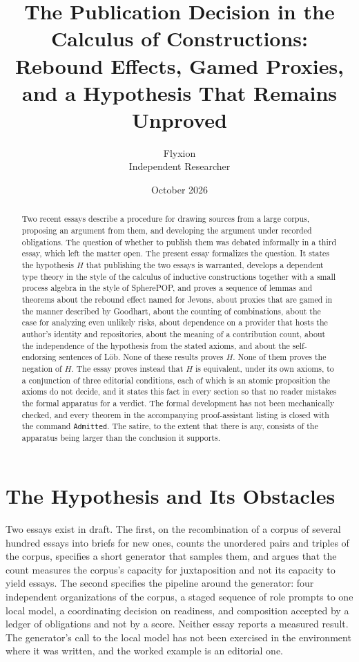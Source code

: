 \documentclass[11pt]{article}
\title{The Publication Decision in the Calculus of Constructions:\\[0.3em]
\large Rebound Effects, Gamed Proxies, and a Hypothesis That Remains Unproved}
\author{Flyxion\\Independent Researcher}
\date{October 2026}
\theoremstyle{plain}
\theoremstyle{definition}
\theoremstyle{remark}
\newcommand{\Hyp}{H}
\begin{document}
\maketitle

\begin{abstract}
\noindent Two recent essays describe a procedure for drawing sources from a large corpus, proposing an argument from them, and developing the argument under recorded obligations. The question of whether to publish them was debated informally in a third essay, which left the matter open. The present essay formalizes the question. It states the hypothesis $\Hyp$ that publishing the two essays is warranted, develops a dependent type theory in the style of the calculus of inductive constructions together with a small process algebra in the style of SpherePOP, and proves a sequence of lemmas and theorems about the rebound effect named for Jevons, about proxies that are gamed in the manner described by Goodhart, about the counting of combinations, about the case for analyzing even unlikely risks, about dependence on a provider that hosts the author's identity and repositories, about the meaning of a contribution count, about the independence of the hypothesis from the stated axioms, and about the self-endorsing sentences of L\"ob. None of these results proves $\Hyp$. None of them proves the negation of $\Hyp$. The essay proves instead that $\Hyp$ is equivalent, under its own axioms, to a conjunction of three editorial conditions, each of which is an atomic proposition the axioms do not decide, and it states this fact in every section so that no reader mistakes the formal apparatus for a verdict. The formal development has not been mechanically checked, and every theorem in the accompanying proof-assistant listing is closed with the command \texttt{Admitted}. The satire, to the extent that there is any, consists of the apparatus being larger than the conclusion it supports.
\end{abstract}

\section{The Hypothesis and Its Obstacles}\label{sec:intro}

Two essays exist in draft. The first, on the recombination of a corpus of several hundred essays into briefs for new ones, counts the unordered pairs and triples of the corpus, specifies a short generator that samples them, and argues that the count measures the corpus's capacity for juxtaposition and not its capacity to yield essays. The second specifies the pipeline around the generator: four independent organizations of the corpus, a staged sequence of role prompts to one local model, a coordinating decision on readiness, and composition accepted by a ledger of obligations and not by a score. Neither essay reports a measured result. The generator's call to the local model has not been exercised in the environment where it was written, and the worked example is an editorial one.
\end{document}
